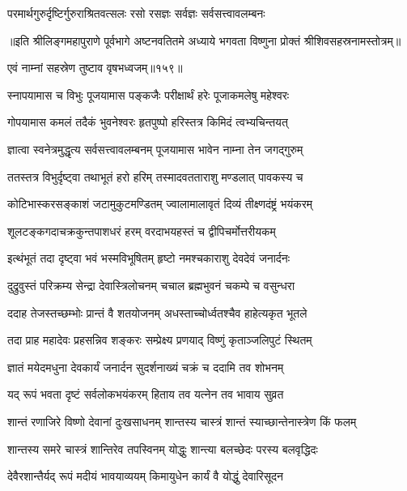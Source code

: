\twolineshloka
{परमार्थगुरुर्दृष्टिर्गुरुराश्रितवत्सलः}
{रसो रसज्ञः सर्वज्ञः सर्वसत्त्वावलम्बनः}


॥इति श्रीलिङ्गमहापुराणे पूर्वभागे अष्टनवतितमे अध्याये भगवता विष्णुना प्रोक्तं श्रीशिवसहस्रनामस्तोत्रम्॥


{एवं नाम्नां सहस्रेण तुष्टाव वृषभध्वजम्॥१५९॥}%

\resetShloka
\addtocounter{shlokacount}{159}


\twolineshloka
{स्नापयामास च विभुः पूजयामास पङ्कजैः}
{परीक्षार्थं हरेः पूजाकमलेषु महेश्वरः}%

\twolineshloka
{गोपयामास कमलं तदैकं भुवनेश्वरः}
{हृतपुष्पो हरिस्तत्र किमिदं त्वभ्यचिन्तयत्}%

\twolineshloka
{ज्ञात्वा स्वनेत्रमुद्धृत्य सर्वसत्त्वावलम्बनम्}
{पूजयामास भावेन नाम्ना तेन जगद्गुरुम्}%

\twolineshloka
{ततस्तत्र विभुर्दृष्ट्वा तथाभूतं हरो हरिम्}
{तस्मादवतताराशु मण्डलात् पावकस्य च}%

\twolineshloka
{कोटिभास्करसङ्काशं जटामुकुटमण्डितम्}
{ज्वालामालावृतं दिव्यं तीक्ष्णदंष्ट्रं भयंकरम्}%

\twolineshloka
{शूलटङ्कगदाचक्रकुन्तपाशधरं हरम्}
{वरदाभयहस्तं च द्वीपिचर्मोत्तरीयकम्}%

\twolineshloka
{इत्थंभूतं तदा दृष्ट्वा भवं भस्मविभूषितम्}
{हृष्टो नमश्चकाराशु देवदेवं जनार्दनः}%

\twolineshloka
{दुद्रुवुस्तं परिक्रम्य सेन्द्रा देवास्त्रिलोचनम्}
{चचाल ब्रह्मभुवनं चकम्पे च वसुन्धरा}%

\twolineshloka
{ददाह तेजस्तच्छम्भोः प्रान्तं वै शतयोजनम्}
{अधस्ताच्चोर्ध्वतश्चैव हाहेत्यकृत भूतले}%

\twolineshloka
{तदा प्राह महादेवः प्रहसन्निव शङ्करः}
{सम्प्रेक्ष्य प्रणयाद् विष्णुं कृताञ्जलिपुटं स्थितम्}%

\twolineshloka
{ज्ञातं मयेदमधुना देवकार्यं जनार्दन}
{सुदर्शनाख्यं चक्रं च ददामि तव शोभनम्}%

\twolineshloka
{यद् रूपं भवता दृष्टं सर्वलोकभयंकरम्}
{हिताय तव यत्नेन तव भावाय सुव्रत}%

\twolineshloka
{शान्तं रणाजिरे विष्णो देवानां दुःखसाधनम्}
{शान्तस्य चास्त्रं शान्तं स्याच्छान्तेनास्त्रेण किं फलम्}%

\twolineshloka
{शान्तस्य समरे चास्त्रं शान्तिरेव तपस्विनम्}
{योद्धुः शान्त्या बलच्छेदः परस्य बलवृद्धिदः}%

\twolineshloka
{देवैरशान्तैर्यद् रूपं मदीयं भावयाव्ययम्}
{किमायुधेन कार्यं वै योद्धुं देवारिसूदन}%

